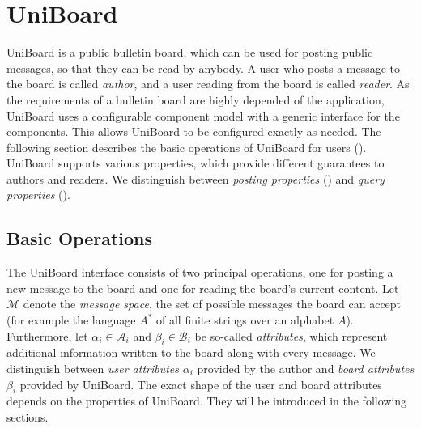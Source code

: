 \documentclass[bibtotoc,halfparskip,oneside]{scrreprt}
\begin{document}
\chapter{UniBoard}\label{ub}

UniBoard is a public bulletin board, which can be used for posting public messages, so that they can be read by anybody.
A user who posts a message to the board is called \emph{author}, and a user reading from the board is called \emph{reader}. As the requirements of a bulletin board are highly depended of the application, UniBoard uses a configurable component model with a generic interface for the components. This allows UniBoard to be configured exactly as needed. The following section describes the basic operations of UniBoard for users (). UniBoard supports various properties, which provide different guarantees to authors and readers. We distinguish between \emph{posting properties} () and \emph{query properties} ().
%

\section{Basic Operations}\label{ub1}

The UniBoard interface consists of two principal operations, one for posting a new message to the board and one for reading the board's current content. Let $\mathcal{M}$ denote the \emph{message space}, the set of possible messages the board can accept (for example the language $A^*$ of all finite strings over an alphabet $A$). Furthermore, let $\alpha_i\in\mathcal{A}_i$ and $\beta_i\in\mathcal{B}_i$ be so-called \emph{attributes}, which represent additional information  written to the board along with every message. We distinguish between \emph{user attributes} $\alpha_i$ provided by the author and \emph{board attributes} $\beta_i$ provided by UniBoard. The exact shape of the user and board attributes depends on the properties of UniBoard. They will be introduced in the following sections.
\end{document}
